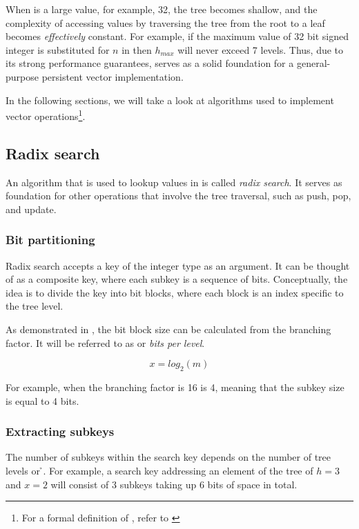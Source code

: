 When \m{} is a large value, for example, 32, the tree becomes shallow, and the complexity of accessing values by traversing the tree from the root to a leaf becomes \emph{effectively} constant. For example, if the maximum value of 32 bit signed integer is substituted for $n$ in  then $h_{max}$ will never exceed 7 levels. Thus, due to its strong performance guarantees, \treerb{} serves as a solid foundation for a general-purpose persistent vector implementation.

In the following sections, we will take a look at \treerb{} algorithms used to implement vector operations\footnote{For a formal definition of \treerb{}, refer to \cite{improving-performance-through-transience}}.

\subsection{Radix search}
\label{sec:rb-tree-radix-search}

An algorithm that is used to lookup values in \treerb{} is called \emph{radix search}. It serves as foundation for other operations that involve the tree traversal, such as push, pop, and update.

\subsubsection*{Bit partitioning}
Radix search accepts a key of the integer type as an argument. It can be thought of as a composite key, where each subkey is a sequence of bits. Conceptually, the idea is to divide the key into bit blocks, where each block is an index specific to the tree level.

As demonstrated in , the bit block size can be calculated from the branching factor. It will be referred to as \x{} or \emph{bits per level}.

\begin{equation}
    \label{eq:bits-per-level}
    x = log_2(m)
\end{equation}

For example, when the branching factor \m{} is 16 \x{} is 4, meaning that the subkey size is equal to 4 bits.

\subsubsection*{Extracting subkeys}
The number of subkeys within the search key depends on the number of tree levels or \h{}. For example, a search key addressing an element of the tree of ${h = 3}$ and ${x = 2}$ will consist of 3 subkeys taking up 6 bits of space in total.

